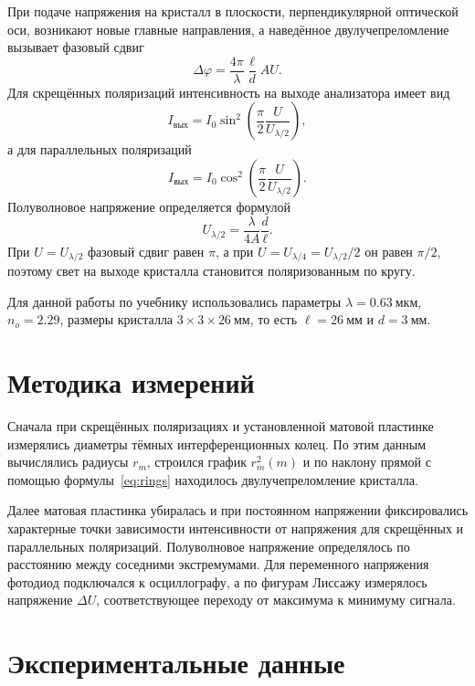 \documentclass[a4paper,12pt]{article}
\begin{document}
При подаче напряжения на кристалл в плоскости, перпендикулярной оптической оси, возникают новые главные направления, а наведённое двулучепреломление вызывает фазовый сдвиг
\begin{equation}
\Delta\varphi=\frac{4\pi}{\lambda}\frac{\ell}{d}AU.
\end{equation}
Для скрещённых поляризаций интенсивность на выходе анализатора имеет вид
\begin{equation}
I_{\text{вых}}=I_0\sin^2\left(\frac{\pi}{2}\frac{U}{U_{\lambda/2}}\right),
\label{eq:crossed}
\end{equation}
а для параллельных поляризаций
\begin{equation}
I_{\text{вых}}=I_0\cos^2\left(\frac{\pi}{2}\frac{U}{U_{\lambda/2}}\right).
\label{eq:parallel}
\end{equation}
Полуволновое напряжение определяется формулой
\begin{equation}
U_{\lambda/2}=\frac{\lambda}{4A}\frac{d}{\ell}.
\label{eq:uhalf}
\end{equation}
При $U=U_{\lambda/2}$ фазовый сдвиг равен $\pi$, а при $U=U_{\lambda/4}=U_{\lambda/2}/2$ он равен $\pi/2$, поэтому свет на выходе кристалла становится поляризованным по кругу.

Для данной работы по учебнику использовались параметры $\lambda=0.63~\text{мкм}$, $n_o=2.29$, размеры кристалла $3\times3\times26~\text{мм}$, то есть $\ell=26~\text{мм}$ и $d=3~\text{мм}$.

\section*{Методика измерений}
Сначала при скрещённых поляризациях и установленной матовой пластинке измерялись диаметры тёмных интерференционных колец. По этим данным вычислялись радиусы $r_m$, строился график $r_m^2(m)$ и по наклону прямой с помощью формулы~\eqref{eq:rings} находилось двулучепреломление кристалла.

Далее матовая пластинка убиралась и при постоянном напряжении фиксировались характерные точки зависимости интенсивности от напряжения для скрещённых и параллельных поляризаций. Полуволновое напряжение определялось по расстоянию между соседними экстремумами. Для переменного напряжения фотодиод подключался к осциллографу, а по фигурам Лиссажу измерялось напряжение $\Delta U$, соответствующее переходу от максимума к минимуму сигнала.

\section*{Экспериментальные данные}
\end{document}
